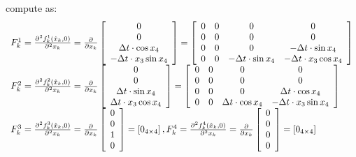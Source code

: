 \documentclass{article}
\begin{document}
compute as:
\begin{equation}
\begin{array}{l}
 F_k^1  = \frac{{\partial ^2 f_k^1 (\hat x_k ,0)}}{{\partial ^2 x_k }} = \frac{\partial }{{\partial x_k }}\left[ {\begin{array}{*{20}c}
   0  \\
   0  \\
   {\Delta t \cdot \cos x_4 }  \\
   { - \Delta t \cdot x_3 \sin x_4 }  \\
\end{array}} \right] = \left[ {\begin{array}{*{20}c}
   0 & 0 & 0 & 0  \\
   0 & 0 & 0 & 0  \\
   0 & 0 & 0 & { - \Delta t \cdot \sin x_4 }  \\
   0 & 0 & { - \Delta t \cdot \sin x_4 } & { - \Delta t \cdot x_3 \cos x_4 }  \\
\end{array}} \right] \\ 
 F_k^2  = \frac{{\partial ^2 f_k^2 (\hat x_k ,0)}}{{\partial ^2 x_k }} = \frac{\partial }{{\partial x_k }}\left[ {\begin{array}{*{20}c}
   0  \\
   0  \\
   {\Delta t \cdot \sin x_4 }  \\
   {\Delta t \cdot x_3 \cos x_4 }  \\
\end{array}} \right] = \left[ {\begin{array}{*{20}c}
   0 & 0 & 0 & 0  \\
   0 & 0 & 0 & 0  \\
   0 & 0 & 0 & {\Delta t \cdot \cos x_4 }  \\
   0 & 0 & {\Delta t \cdot \cos x_4 } & { - \Delta t \cdot x_3 \sin x_4 }  \\
\end{array}} \right] \\ 
 F_k^3  = \frac{{\partial ^2 f_k^3 (\hat x_k ,0)}}{{\partial ^2 x_k }} = \frac{\partial }{{\partial x_k }}\left[ {\begin{array}{*{20}c}
   0  \\
   0  \\
   1  \\
   0  \\
\end{array}} \right] = \left[ {0_{4 \times 4} } \right],F_k^4  = \frac{{\partial ^2 f_k^4 (\hat x_k ,0)}}{{\partial ^2 x_k }} = \frac{\partial }{{\partial x_k }}\left[ {\begin{array}{*{20}c}
   0  \\
   0  \\
   0  \\
   0  \\
\end{array}} \right] = \left[ {0_{4 \times 4} } \right] \\ 
 \end{array}
\end{equation}
\end{document}
